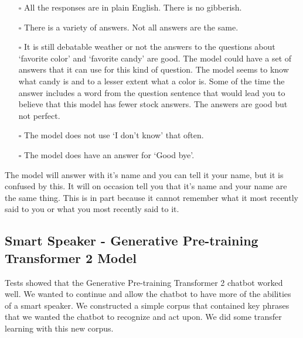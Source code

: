 \begin{itemize}
	
	\item[\rlap{\raisebox{0.3ex}{\hspace{0.4ex}\scriptsize \ding{52}}}$\square$] All the responses are in plain English. There is no gibberish.
	
	\item[\rlap{\raisebox{0.3ex}{\hspace{0.4ex}\scriptsize \ding{52}}}$\square$] There is a variety of answers. Not all answers are the same.
	
	\item[$\square$] It is still debatable weather or not the answers to the questions about `favorite color' and `favorite candy' are good. The model could have a set of answers that it can use for this kind of question. The model seems to know what candy is and to a lesser extent what a color is. Some of the time the answer includes a word from the question sentence that would lead you to believe that this model has fewer stock answers. The answers are good but not perfect.
	
	\item[\rlap{\raisebox{0.3ex}{\hspace{0.4ex}\scriptsize \ding{52}}}$\square$] The model does not use `I don't know' that often. 
	
	\item[\rlap{\raisebox{0.3ex}{\hspace{0.4ex}\scriptsize \ding{52}}}$\square$] The model does have an answer for `Good bye'.
\end{itemize}

The model will answer with it's name and you can tell it your name, but it is confused by this. It will on occasion tell you that it's name and your name are the same thing. This is in part because it cannot remember what it most recently said to you or what you most recently said to it. 

\subsection{Smart Speaker - Generative Pre-training Transformer 2 Model}
Tests showed that the Generative Pre-training Transformer 2 chatbot worked well. We wanted to continue and allow the chatbot to have more of the abilities of a smart speaker. We constructed a simple corpus that contained key phrases that we wanted the chatbot to recognize and act upon. We did some transfer learning with this new corpus.

